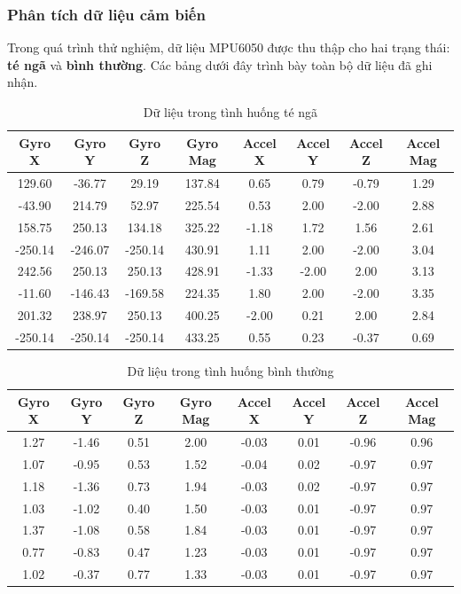 \subsubsection*{Phân tích dữ liệu cảm biến}
Trong quá trình thử nghiệm, dữ liệu MPU6050 được thu thập cho hai trạng thái: \textbf{té ngã} và \textbf{bình thường}.  
Các bảng dưới đây trình bày toàn bộ dữ liệu đã ghi nhận.

\begin{table}[h]
\centering
\caption{Dữ liệu trong tình huống té ngã}
\label{tab:fall_data}
\begin{tabular}{|c|c|c|c|c|c|c|c|}
\hline
\textbf{Gyro X} & \textbf{Gyro Y} & \textbf{Gyro Z} & \textbf{Gyro Mag} & \textbf{Accel X} & \textbf{Accel Y} & \textbf{Accel Z} & \textbf{Accel Mag} \\
\hline
129.60 & -36.77 & 29.19 & 137.84 & 0.65 & 0.79 & -0.79 & 1.29 \\
-43.90 & 214.79 & 52.97 & 225.54 & 0.53 & 2.00 & -2.00 & 2.88 \\
158.75 & 250.13 & 134.18 & 325.22 & -1.18 & 1.72 & 1.56 & 2.61 \\
-250.14 & -246.07 & -250.14 & 430.91 & 1.11 & 2.00 & -2.00 & 3.04 \\
242.56 & 250.13 & 250.13 & 428.91 & -1.33 & -2.00 & 2.00 & 3.13 \\
-11.60 & -146.43 & -169.58 & 224.35 & 1.80 & 2.00 & -2.00 & 3.35 \\
201.32 & 238.97 & 250.13 & 400.25 & -2.00 & 0.21 & 2.00 & 2.84 \\
-250.14 & -250.14 & -250.14 & 433.25 & 0.55 & 0.23 & -0.37 & 0.69 \\
\hline
\end{tabular}
\end{table}

\begin{table}[h]
\centering
\caption{Dữ liệu trong tình huống bình thường}
\label{tab:normal_data}
\begin{tabular}{|c|c|c|c|c|c|c|c|}
\hline
\textbf{Gyro X} & \textbf{Gyro Y} & \textbf{Gyro Z} & \textbf{Gyro Mag} & \textbf{Accel X} & \textbf{Accel Y} & \textbf{Accel Z} & \textbf{Accel Mag} \\
\hline
1.27 & -1.46 & 0.51 & 2.00 & -0.03 & 0.01 & -0.96 & 0.96 \\
1.07 & -0.95 & 0.53 & 1.52 & -0.04 & 0.02 & -0.97 & 0.97 \\
1.18 & -1.36 & 0.73 & 1.94 & -0.03 & 0.02 & -0.97 & 0.97 \\
1.03 & -1.02 & 0.40 & 1.50 & -0.03 & 0.01 & -0.97 & 0.97 \\
1.37 & -1.08 & 0.58 & 1.84 & -0.03 & 0.01 & -0.97 & 0.97 \\
0.77 & -0.83 & 0.47 & 1.23 & -0.03 & 0.01 & -0.97 & 0.97 \\
1.02 & -0.37 & 0.77 & 1.33 & -0.03 & 0.01 & -0.97 & 0.97 \\
\hline
\end{tabular}
\end{table}

